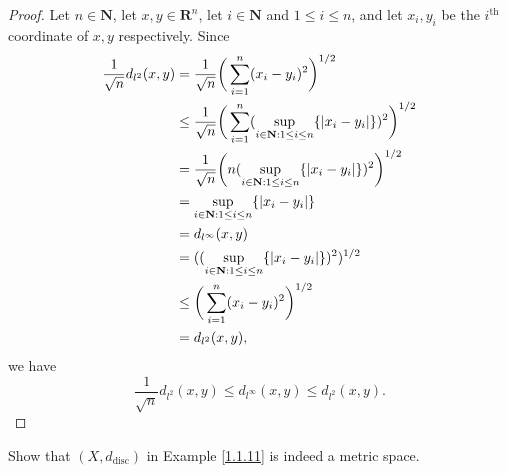 \begin{proof}
    Let \(n \in \mathbf{N}\), let \(x, y \in \mathbf{R}^n\), let \(i \in \mathbf{N}\) and \(1 \leq i \leq n\), and let \(x_i, y_i\) be the \(i^{\text{th}}\) coordinate of \(x, y\) respectively.
    Since
    \begin{align*}
        \frac{1}{\sqrt{n}} d_{l^2}(x, y) & = \frac{1}{\sqrt{n}} \bigg(\sum_{i = 1}^n (x_i - y_i)^2\bigg)^{1 / 2}                                                         \\
                                         & \leq \frac{1}{\sqrt{n}} \bigg(\sum_{i = 1}^n (\sup_{i \in \mathbf{N} : 1 \leq i \leq n} \{\abs*{x_i - y_i}\})^2\bigg)^{1 / 2} \\
                                         & = \frac{1}{\sqrt{n}} \bigg(n (\sup_{i \in \mathbf{N} : 1 \leq i \leq n} \{\abs*{x_i - y_i}\})^2\bigg)^{1 / 2}                 \\
                                         & = \sup_{i \in \mathbf{N} : 1 \leq i \leq n} \{\abs*{x_i - y_i}\}                                                              \\
                                         & = d_{l^\infty}(x, y)                                                                                                          \\
                                         & = ((\sup_{i \in \mathbf{N} : 1 \leq i \leq n} \{\abs*{x_i - y_i}\})^2)^{1 / 2}                                                \\
                                         & \leq \bigg(\sum_{i = 1}^n (x_i - y_i)^2\bigg)^{1 / 2}                                                                         \\
                                         & = d_{l^2}(x, y),
    \end{align*}
    we have
    \[
        \frac{1}{\sqrt{n}} d_{l^2}(x, y) \leq d_{l^\infty}(x, y) \leq d_{l^2}(x, y).
    \]
\end{proof}

\begin{exercise}\label{ex 1.1.11}
    Show that \((X, d_{\text{disc}})\) in Example \ref{1.1.11} is indeed a metric space.
\end{exercise}

